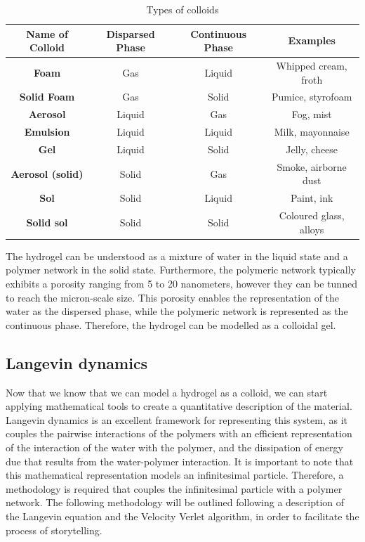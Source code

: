 \begin{table}[ht!]
\begin{tabular}{|c|c|c|c|}
\hline
\textbf{Name of Colloid} & \textbf{Disparsed Phase} & \textbf{Continuous Phase} & \textbf{Examples}      \\ \hline
\textbf{Foam}            & Gas                      & Liquid                    & Whipped cream, froth   \\ \hline
\textbf{Solid Foam}      & Gas                      & Solid                     & Pumice, styrofoam      \\ \hline
\textbf{Aerosol}         & Liquid                   & Gas                       & Fog, mist              \\ \hline
\textbf{Emulsion}        & Liquid                   & Liquid                    & Milk, mayonnaise       \\ \hline
\textbf{Gel}             & Liquid                   & Solid                     & Jelly, cheese          \\ \hline
\textbf{Aerosol (solid)} & Solid                    & Gas                       & Smoke, airborne dust   \\ \hline
\textbf{Sol}             & Solid                    & Liquid                    & Paint, ink             \\ \hline
\textbf{Solid sol}       & Solid                    & Solid                     & Coloured glass, alloys \\ \hline
\end{tabular}
\caption{Types of colloids}\label{tab:colloids}
\end{table}

The hydrogel can be understood as a mixture of water in the liquid state and a polymer network in the solid state.
Furthermore, the polymeric network typically exhibits a porosity ranging from 5 to 20 nanometers, however they can be tunned to reach the micron-scale size.
This porosity enables the representation of the water as the dispersed phase, while the polymeric network is represented as the continuous phase.
Therefore, the hydrogel can be modelled as a colloidal gel.


\subsection{Langevin dynamics}

Now that we know that we can model a hydrogel as a colloid, we can start applying mathematical tools to create a quantitative description of the material.
Langevin dynamics is an excellent framework for representing this system, as it couples 
    the pairwise interactions of the polymers 
    with an efficient representation of the interaction of the water with the polymer, 
    and the dissipation of energy due that results from the water-polymer interaction.
It is important to note that this mathematical representation models an infinitesimal particle.
Therefore, a methodology is required that couples the infinitesimal particle with a polymer network.
The following methodology will be outlined following a description of the Langevin equation and the Velocity Verlet algorithm, in order to facilitate the process of storytelling.

